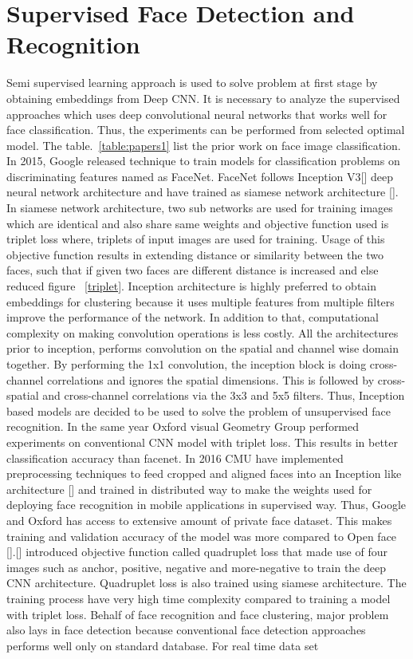 \documentclass[a4paper,12pt, twoside]{NITKReport}
\begin{document}
\section{Supervised Face Detection and Recognition}
\par Semi supervised learning approach is used to solve problem at first stage by obtaining embeddings from Deep CNN. It is necessary to analyze the supervised approaches which uses deep convolutional neural networks that works well for face classification. Thus, the experiments can be performed from selected optimal model. The table.~\ref{table:papers1} list the prior work on face image classification. In 2015, Google released technique to train models for classification problems on discriminating features named as FaceNet. FaceNet follows Inception V3[\cite{DBLP:journals/corr/SzegedyVISW15}] deep neural network architecture and have trained as siamese network architecture [\cite{Koch2015SiameseNN}]. In siamese network architecture, two sub networks are used for training images which are identical and also share same weights and objective function used is triplet loss where, triplets of input images are used for training. Usage of this objective function results in extending distance or similarity between the two faces, such that if given two faces are different distance is increased and else reduced figure ~\ref{triplet}. Inception architecture is highly preferred to obtain embeddings for clustering because it uses multiple features from multiple filters improve the performance of the network. In addition to that, computational complexity on making convolution operations is less costly. All the architectures prior to inception, performs convolution on the spatial and channel wise domain together. By performing the 1x1 convolution, the inception block is doing cross-channel correlations and ignores the spatial dimensions. This is followed by cross-spatial and cross-channel correlations via the 3x3 and 5x5 filters. Thus, Inception based models are decided to be used to solve the problem of unsupervised face recognition. In the same year Oxford visual Geometry Group performed experiments on conventional CNN model with triplet loss. This results in better classification accuracy than facenet. In 2016 CMU have implemented preprocessing techniques to feed cropped and aligned faces into an Inception like architecture [\cite{amos2016openface}] and trained in distributed way to make the weights used for deploying face recognition in mobile applications in supervised way. Thus, Google and Oxford has access to extensive amount of private face dataset. This makes training and validation accuracy of the model was more compared to Open face [\cite{amos2016openface}].[\cite{chen2017beyond}] introduced objective function called quadruplet loss that made use of four images such as anchor, positive, negative and more-negative to train the deep CNN architecture. Quadruplet loss is also trained using siamese architecture. The training process have very high time complexity compared to training a model with triplet loss. Behalf of face recognition and face clustering, major problem also lays in face detection because conventional face detection approaches performs well only on standard database. For real time data set 
\end{document}
